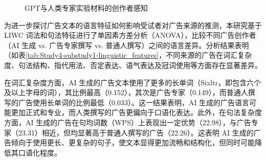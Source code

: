 \begin{figure}[H]
    \centering
    \hspace{2em} %
    \caption{\label{fig:Study4-exp1-perception} GPT与人类专家实验材料的创作者感知}
\end{figure}

为进一步探讨广告文本的语言特征如何影响受试者对广告来源的推测，本研究基于 LIWC 词法和句法特征进行了单因素方差分析（ANOVA），比较不同广告创作者（AI 生成 vs. 广告专家撰写 vs. 普通人撰写）之间的语言差异。分析结果表明（如表\ref{tab:Study4-substudy1-linguistic_features}，不同来源的广告在词汇复杂度、句法结构、指代用法、否定表达、语气表达及冠词使用等方面存在显著差异。

在词汇复杂度方面，AI 生成的广告文本使用了更多的长单词（Sixltr，即包含六个及以上字母的词），其比例最高（0.152），其次是广告专家（0.149），而普通人撰写的广告使用长单词的比例最低（0.033）。这一结果表明，AI 生成的广告语言可能更加正式和专业，而人类撰写的广告更偏向于口语化表达。此外，在句法复杂度方面，AI 生成的广告在句均词数（WPS）上表现出一定优势（22.98），与广告专家（23.31）相近，但均显著高于普通人撰写的广告（22.26）。这表明 AI 生成的广告倾向于使用更长、更复杂的句子，使文本显得更加流畅和结构化，但同时可能降低其口语化程度。

